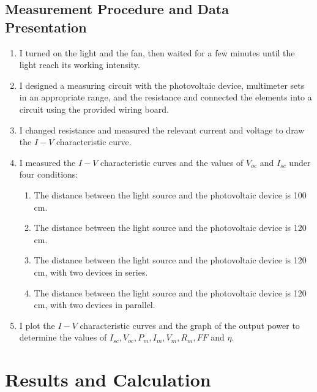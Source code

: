 \documentclass[12pt]{article}
\begin{document}
\subsection{Measurement Procedure and Data Presentation}
\begin{enumerate}
\item I turned on the light and the fan, then waited for a few minutes until the light reach its working intensity.
\item I designed a measuring circuit with the photovoltaic device, multimeter sets in an appropriate range, and the resistance and connected the elements into a circuit using the provided wiring board.
\item I changed resistance and measured the relevant current and voltage to draw the $I-V$ characteristic curve.
\item I measured the $I-V$ characteristic curves and the values of $V_{oc}$ and $I_{sc}$ under four conditions:
\begin{enumerate}[i]
\item The distance between the light source and the photovoltaic device is 100 cm.
\item The distance between the light source and the photovoltaic device is 120 cm.
\item The distance between the light source and the photovoltaic device is 120 cm,
with two devices in series.
\item The distance between the light source and the photovoltaic device is 120 cm,
with two devices in parallel.
\end{enumerate}
\item I plot the $I-V$ characteristic curves and the graph of the output power to determine the values of $I_{sc},V_{oc},P_m,I_m,V_m,R_m,FF$ and $\eta$.
\end{enumerate}  
\section{Results and Calculation}
\end{document}
